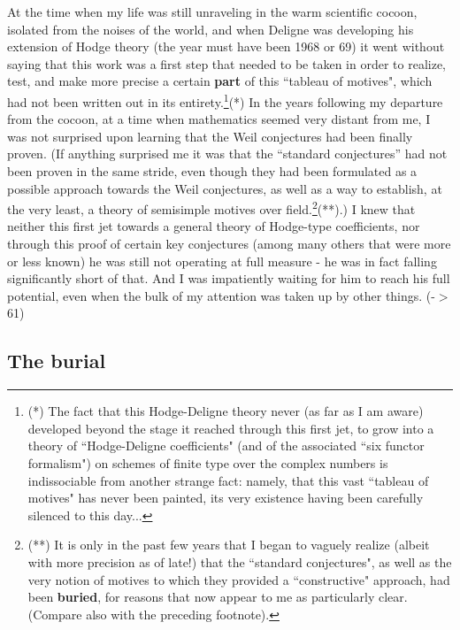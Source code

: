 At the time when my life was still unraveling in the warm scientific cocoon, isolated from
the noises of the world, and when Deligne was developing his extension of Hodge theory
(the year must have been 1968 or 69) it went without saying that this work was a first
step that needed to be taken in order to realize, test, and make more precise a certain
\textbf{part} of this ``tableau of motives", which had not been written out in its
entirety.\footnote{(*) The fact that this Hodge-Deligne theory never (as far as I am aware) developed beyond the stage it reached through this first jet, to grow into a theory of ``Hodge-Deligne coefficients" (and of the associated ``six functor formalism") on schemes of finite type over the complex numbers is indissociable from another strange fact: namely, that this vast ``tableau of motives" has never been painted, its very existence having been carefully silenced to this day...}(*)
In the years following my departure from the cocoon, at a time when mathematics seemed
very distant from  me, I was not surprised upon learning that the Weil conjectures had
been finally proven. (If anything surprised me it was that the ``standard conjectures''
had not been proven in the same stride, even though they had been formulated as a possible
approach towards the Weil conjectures, as well as a way to establish, at the very least, a
theory of semisimple motives over  field.\footnote{(**) It is only in the past few years that I began to vaguely realize (albeit with more precision as of late!) that the ``standard conjectures", as well as the very notion of motives to which they provided a ``constructive" approach, had been \textbf{buried}, for reasons that now appear to me as particularly clear. (Compare also with the preceding footnote).}(**).)
I knew that neither this first 
jet towards a general theory of Hodge-type coefficients, nor
through this proof of certain key conjectures (among many others that were more or less
known) he was still not operating at full measure - he was in fact falling significantly
short of that. And I was impatiently waiting for him to reach his full potential, even
when the bulk of my attention was taken up by other things. (-$>$ 61)

\subsection{The burial}

